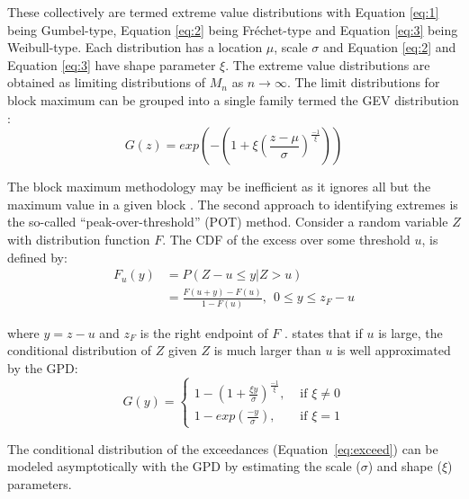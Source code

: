These collectively are termed extreme value distributions with Equation \ref{eq:1} being Gumbel-type, Equation \ref{eq:2} being Fr\'echet-type and Equation \ref{eq:3} being Weibull-type. Each distribution has a location $\mu$, scale $\sigma$ and Equation \ref{eq:2} and Equation \ref{eq:3} have shape parameter $\xi$. The extreme value distributions are obtained as limiting distributions of $M_n$ as $n \to \infty$. The limit distributions for block maximum can be grouped into a single family termed the \gls{GEV} distribution \citep{dehaan2007extreme}:
\begin{equation}
    G(z) = exp\left(-\left(1+\xi\left(\frac{z-\mu}{\sigma}\right)^{\frac{-1}{\xi}}\right)\right)
    \label{eq:GEV}
\end{equation}

The block maximum methodology may be inefficient as it ignores all but the maximum value in a given block \citep{davison2015statistics}. The second approach to identifying extremes is the so-called ``peak-over-threshold'' (POT) method. Consider a random variable $Z$ with distribution function $F$. The CDF of the excess over some threshold $u$, is defined by:
\begin{equation}
    \begin{aligned}
        F_u(y) & = P(Z - u \leq y | Z > u)                               \\
               & = \frac{F(u+y) - F(u)}{1-F(u)}, \ \ 0 \leq y \leq z_F-u
    \end{aligned}
    \label{eq:exceed}
\end{equation}

\lowercase{Where} $y = z - u$ and $z_F$ is the right endpoint of $F$ \citep{gilli2006application}. \cite{pickands1975statistical} states that if $u$ is large, the conditional distribution of $Z$ given $Z$ is much larger than $u$ is well approximated by the \gls{GPD}:
\begin{equation}
    G(y) =
    \begin{cases}
        1 - \left(1 + \frac{\xi y}{\sigma}\right)^{\frac{-1}{\xi }}, & \text{ if } \xi  \neq 0 \\
        1-exp\left(\frac{-y}{\sigma} \right),                        & \text{ if } \xi  = 1
    \end{cases}
    \label{eq:GPD}
\end{equation}

The conditional distribution of the exceedances (Equation~\ref{eq:exceed}) can be modeled asymptotically with the \gls{GPD} by estimating the scale ($\sigma$) and shape ($\xi$) parameters.

